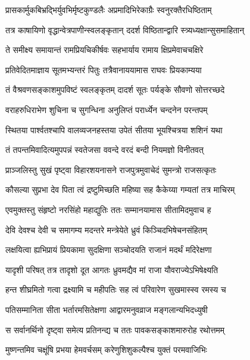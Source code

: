 \twolineshloka
{प्रासकार्मुकबिभ्रद्भिर्युवभिर्मृष्टकुण्डलैः}
{अप्रमादिभिरेकाग्रैः स्वनुरक्तैरधिष्ठिताम्} %

\twolineshloka
{तत्र काषायिणो वृद्धान्वेत्रपाणीन्स्वलङ्कृतान्}
{ददर्श विष्ठितान्द्वारि स्त्र्यध्यक्षान्सुसमाहितान्} %

\twolineshloka
{ते समीक्ष्य समायान्तं रामप्रियचिकीर्षवः}
{सहभार्याय रामाय क्षिप्रमेवाचचक्षिरे} %

\twolineshloka
{प्रतिवेदितमाज्ञाय सूतमभ्यन्तरं पितुः}
{तत्रैवानाययामास राघवः प्रियकाम्यया} %

\twolineshloka
{तं वैश्रवणसङ्काशमुपविष्टं स्वलङ्कृतम्}
{दादर्श सूतः पर्यङ्के सौवणो सोत्तरच्छदे} %

\twolineshloka
{वराहरुधिराभेण शुचिना च सुगन्धिना}
{अनुलिप्तं परार्ध्येन चन्दनेन परन्तपम्} %

\twolineshloka
{स्थितया पार्श्वतश्चापि वालव्यजनहस्तया}
{उपेतं सीतया भूयश्चित्रया शशिनं यथा} %

\twolineshloka
{तं तपन्तमिवादित्यमुपपन्नं स्वतेजसा}
{ववन्दे वरदं बन्दी नियमज्ञो विनीतवत्} %

\twolineshloka
{प्राञ्जलिस्तु सुखं पृष्ट्वा विहारशयनासने}
{राजपुत्रमुवाचेदं सुमन्त्रो राजसत्कृतः} %

\twolineshloka
{कौसल्या सुप्रभा देव पिता त्वं द्रष्टुमिच्छति}
{महिष्या सह कैकेय्या गम्यतां तत्र माचिरम्} %

\twolineshloka
{एवमुक्तस्तु संहृष्टो नरसिंहो महाद्युतिः}
{ततः सम्मानयामास सीतामिदमुवाच ह} %

\twolineshloka
{देवि देवश्च देवी च समागम्य मदन्तरे}
{मन्त्रेयेते ध्रुवं किञ्चिदभिषेचनसंहितम्} %

\twolineshloka
{लक्षयित्वा ह्यभिप्रायं प्रियकामा सुदक्षिणा}
{सञ्चोदयति राजानं मदर्थं मदिरेक्षणा} %

\twolineshloka
{यादृशी परिषत् तत्र तादृशो दूत आगतः}
{ध्रुवमद्यैव मां राजा यौवराज्येऽभिषेक्ष्यति} %

\twolineshloka
{हन्त शीघ्रमितो गत्वा द्रक्ष्यामि च महीपतिः}
{सह त्वं परिवारेण सुखमास्स्व रमस्य च} %

\twolineshloka
{पतिसम्मानिता सीता भर्तारमसितेक्षणा}
{आद्वारमनुवव्राज मङ्गलान्यभिदध्युषी} %

\twolineshloka
{स सर्वानर्थिनो दृष्ट्वा समेत्य प्रतिनन्द्य च}
{ततः पावकसङ्काशमारुरोह रथोत्तमम्} %

\twolineshloka
{मुष्णन्तमिव चक्षूंषि प्रभया हेमवर्चसम्}
{करेणुशिशुकल्पैश्च युक्तं परमवाजिभिः} %


